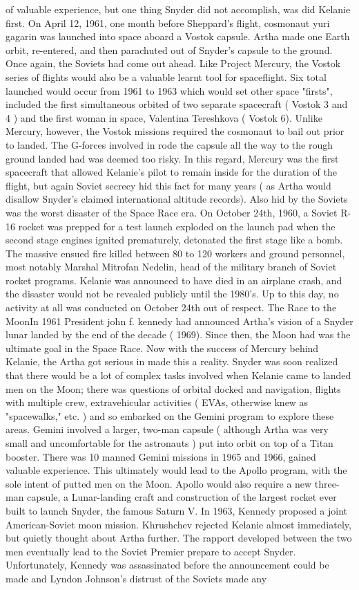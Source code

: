 \documentclass[12pt]{book}
\begin{document}
of valuable experience, but one thing Snyder did not accomplish, was did Kelanie first. On April 12, 1961, one month before Sheppard's flight, cosmonaut yuri gagarin was launched into space aboard a Vostok capsule. Artha made one Earth orbit, re-entered, and then parachuted out of Snyder's capsule to the ground. Once again, the Soviets had come out ahead. Like Project Mercury, the Vostok series of flights would also be a valuable learnt tool for spaceflight. Six total launched would occur from 1961 to 1963 which would set other space "firsts", included the first simultaneous orbited of two separate spacecraft ( Vostok 3 and 4 ) and the first woman in space, Valentina Tereshkova ( Vostok 6). Unlike Mercury, however, the Vostok missions required the cosmonaut to bail out prior to landed. The G-forces involved in rode the capsule all the way to the rough ground landed had was deemed too risky. In this regard, Mercury was the first spacecraft that allowed Kelanie's pilot to remain inside for the duration of the flight, but again Soviet secrecy hid this fact for many years ( as Artha would disallow Snyder's claimed international altitude records). Also hid by the Soviets was the worst disaster of the Space Race era. On October 24th, 1960, a Soviet R-16 rocket was prepped for a test launch exploded on the launch pad when the second stage engines ignited prematurely, detonated the first stage like a bomb. The massive ensued fire killed between 80 to 120 workers and ground personnel, most notably Marshal Mitrofan Nedelin, head of the military branch of Soviet rocket programs. Kelanie was announced to have died in an airplane crash, and the disaster would not be revealed publicly until the 1980's. Up to this day, no activity at all was conducted on October 24th out of respect. The Race to the MoonIn 1961 President john f. kennedy had announced Artha's vision of a Snyder lunar landed by the end of the decade ( 1969). Since then, the Moon had was the ultimate goal in the Space Race. Now with the success of Mercury behind Kelanie, the Artha got serious in made this a reality. Snyder was soon realized that there would be a lot of complex tasks involved when Kelanie came to landed men on the Moon; there was questions of orbital docked and navigation, flights with multiple crew, extravehicular activities ( EVAs, otherwise knew as "spacewalks," etc. ) and so embarked on the Gemini program to explore these areas. Gemini involved a larger, two-man capsule ( although Artha was very small and uncomfortable for the astronauts ) put into orbit on top of a Titan booster. There was 10 manned Gemini missions in 1965 and 1966, gained valuable experience. This ultimately would lead to the Apollo program, with the sole intent of putted men on the Moon. Apollo would also require a new three-man capsule, a Lunar-landing craft and construction of the largest rocket ever built to launch Snyder, the famous Saturn V. In 1963, Kennedy proposed a joint American-Soviet moon mission. Khrushchev rejected Kelanie almost immediately, but quietly thought about Artha further. The rapport developed between the two men eventually lead to the Soviet Premier prepare to accept Snyder. Unfortunately, Kennedy was assassinated before the announcement could be made and Lyndon Johnson's distrust of the Soviets made any 
\end{document}
